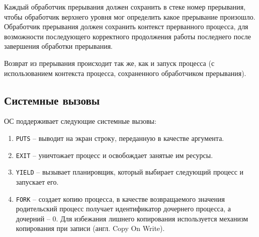 Каждый обработчик прерывания должен сохранить в стеке номер прерывания, чтобы обработчик верхнего уровня
мог определить какое прерывание произошло. Обработчик прерывания должен сохранить контекст прерванного
процесса, для возможности последующего корректного продолжения работы последнего после завершения обработки
прерывания.

Возврат из прерывания происходит так же, как и запуск процесса (с использованием контекста процесса,
сохраненного обработчиком прерывания).

\subsection{Системные вызовы}
ОС поддерживает следующие системные вызовы:
\begin{enumerate}[1.]
\item \texttt{PUTS} -- выводит на экран строку, переданную в качестве аргумента.
\item \texttt{EXIT} -- уничтожает процесс и освобождает занятые им ресурсы.
\item \texttt{YIELD} -- вызывает планировщик, который выбирает следующий процесс и запускает его.
\item \texttt{FORK} -- создает копию процесса, в качестве возвращаемого значения родительский
	процесс получает идентификатор дочернего процесса, а дочерний -- 0. Для избежания лишнего
	копирования используется механизм копирования при записи (англ. Copy On Write).
\end{enumerate}
